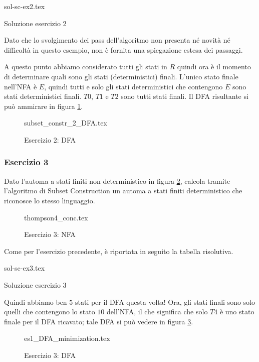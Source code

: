 \documentclass[class=book, crop=false, oneside, 12pt]{standalone}
\begin{document}
\begin{table}[H]
	\centering
	{sol-sc-ex2.tex}
    \caption{Soluzione esercizio 2}
    \label{sol-sc-ex2}
\end{table} 

Dato che lo svolgimento dei pass dell'algoritmo non presenta né novità né difficoltà in questo esempio, non è fornita una spiegazione estesa dei passaggi.

A questo punto abbiamo considerato tutti gli stati in \(R\) quindi ora è il momento di determinare quali sono gli stati (deterministici) finali. L’unico stato finale nell'NFA è \(E\), quindi tutti e solo gli stati deterministici che contengono \(E\) sono stati deterministici finali. \(T0\), \(T1\) e \(T2\) sono tutti stati finali. Il DFA risultante si può ammirare in figura \ref{sol_sc_2}.
\begin{figure}[H]
    \centering
    {subset_constr_2_DFA.tex}
    \caption{Esercizio 2: DFA}
    \label{sol_sc_2}
\end{figure}

\subsubsection*{Esercizio 3}
Dato l'automa a stati finiti non deterministico in figura \ref{es_sc_3}, calcola tramite l'algoritmo di Subset Construction un automa a stati finiti deterministico che riconosce lo stesso linguaggio.
\begin{figure}[H]
    \centering
    {thompson4_conc.tex}
    \caption{Esercizio 3: NFA}
    \label{es_sc_3}
\end{figure}
Come per l'esercizio precedente, è riportata in seguito la tabella risolutiva.\\

\begin{table}[H]
	\centering
	{sol-sc-ex3.tex}
    \caption{Soluzione esercizio 3}
    \label{sol-sc-ex3}
\end{table}

Quindi abbiamo ben \(5\) stati per il DFA questa volta! Ora, gli stati finali sono solo quelli che contengono lo stato \(10\) dell'NFA, il che significa che solo \(T4\) è uno stato finale per il DFA ricavato; tale DFA si può vedere in figura \ref{sol_sc_3}.
\begin{figure}[H]
    \centering
    {es1_DFA_minimization.tex}
    \caption{Esercizio 3: DFA}
    \label{sol_sc_3}
\end{figure}
\end{document}

